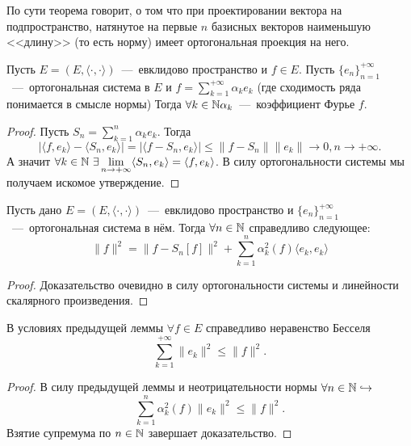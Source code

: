 \begin{note}
    По сути теорема говорит, о том что при проектировании вектора на подпространство, натянутое на первые $n$ базисных векторов
    наименьшую <<длину>> (то есть норму) имеет ортогональная проекция на него.
\end{note}
\begin{theorem}[О единственности]
    Пусть $E = (E, \langle \cdot, \cdot \rangle)$~---~евклидово пространство и $f \in E$.
    Пусть $\{e_n\}_{n = 1}^{+\infty}$~---~ортогональная система в $E$ и $f = \sum\limits_{k = 1}^{+\infty} \alpha_k e_k$ (где сходимость ряда понимается в смысле нормы)
    Тогда $\forall k \in \mathbb{N} \alpha_k$~---~коэффициент Фурье $f$.
\end{theorem}
\begin{proof}
    Пусть $S_n = \sum\limits_{k = 1}^n \alpha_k e_k$.
    Тогда
    \[
        |\langle f, e_k \rangle - \langle S_n, e_k \rangle| = |\langle f - S_n, e_k \rangle| \leq \|f - S_n\|\|e_k\| \rightarrow 0, n \rightarrow +\infty.
    \]
    А значит $\forall k \in \mathbb{N} \ \exists \lim\limits_{n \rightarrow +\infty} \langle S_n, e_k \rangle = \langle f, e_k \rangle$.
    В силу ортогональности системы мы получаем искомое утверждение.
\end{proof}
\begin{lemma}
    Пусть дано $E = (E, \langle \cdot, \cdot \rangle)$~---~евклидово пространство и $\{e_n\}_{n = 1}^{+\infty}$~---~ортогональная система в нём.
    Тогда $\forall n \in \mathbb{N}$ справедливо следующее:
    \[
        \|f\|^2 = \|f - S_n[f]\|^2 + \sum\limits_{k = 1}^n \alpha_k^2(f)\langle e_k, e_k \rangle
    \]
\end{lemma}
\begin{proof}
    Доказательство очевидно в силу ортогональности системы и линейности скалярного произведения.
\end{proof}
\begin{corollary}
    В условиях предыдущей леммы $\forall f \in E$ справедливо неравенство Бесселя
    \[
        \sum\limits_{k = 1}^{+\infty} \|e_k\|^2 \leq \|f\|^2.
    \]
\end{corollary}
\begin{proof}
    В силу предыдущей леммы и неотрицательности нормы $\forall n \in \mathbb{N} \hookrightarrow$
    \[
        \sum\limits_{k = 1}^n \alpha_k^2(f)\|e_k\|^2 \leq \|f\|^2.
    \]
    Взятие супремума по $n \in \mathbb{N}$ завершает доказательство.
\end{proof}
